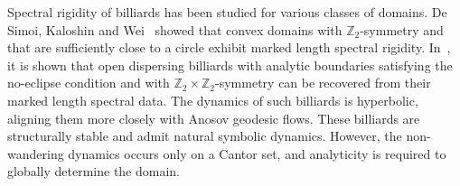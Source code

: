 \documentclass[reqno,11pt]{amsart}
\begin{document}
Spectral rigidity of billiards has been studied for various classes of domains. De Simoi, Kaloshin and Wei~\cite{desimoikal} showed that convex domains with $\mathbb{Z}_2$-symmetry and that are sufficiently close to a circle exhibit marked length spectral rigidity. In~\cite{de2023marked}, it is shown that open dispersing billiards with analytic boundaries satisfying the no-eclipse condition and with $\mathbb{Z}_2 \times \mathbb{Z}_2$-symmetry can be recovered from their marked length spectral data. The dynamics of such billiards is hyperbolic, aligning them more closely with Anosov geodesic flows. These billiards are structurally stable and admit natural symbolic dynamics. However, the non-wandering dynamics occurs only on a Cantor set, and analyticity is required to globally determine the domain.\\
\end{document}
